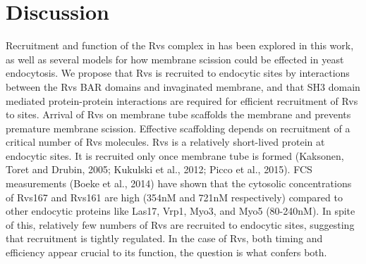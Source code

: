 \documentclass[9pt,lineno]{elife}
\begin{document}






\section{Discussion}

Recruitment and function of the Rvs complex in has been explored in this work, as well as several models for how membrane scission could be effected in yeast endocytosis. We propose that Rvs is recruited to endocytic sites by interactions between the Rvs BAR domains and invaginated membrane, and that SH3 domain mediated protein-protein interactions are required for efficient recruitment of Rvs to sites. Arrival of Rvs on membrane tube scaffolds the membrane and prevents premature membrane scission. Effective scaffolding depends on recruitment of a critical number of Rvs molecules. Rvs is a relatively short-lived protein at endocytic sites. It is recruited only once membrane tube is formed (Kaksonen, Toret and Drubin, 2005; Kukulski et al., 2012; Picco et al., 2015). FCS measurements (Boeke et al., 2014) have shown that the cytosolic concentrations of Rvs167 and Rvs161 are high (354nM and 721nM respectively) compared to other endocytic proteins like Las17, Vrp1, Myo3, and Myo5 (80-240nM). In spite of this, relatively few numbers of Rvs are recruited to endocytic sites, suggesting that recruitment is tightly regulated. In the case of Rvs, both timing and efficiency appear crucial to its function, the question is what confers both.
\end{document}
